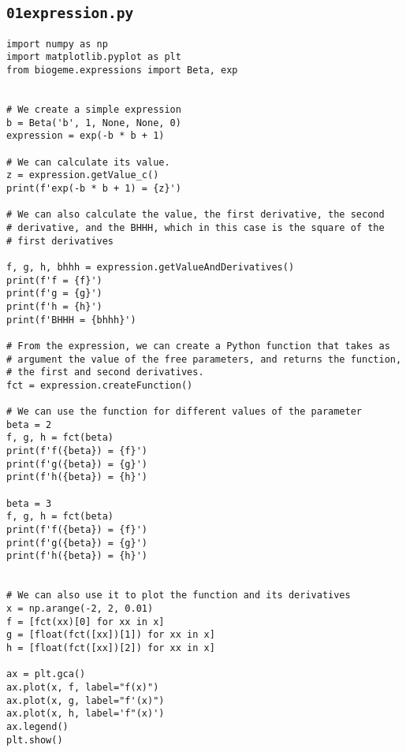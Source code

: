 \documentclass[12pt,a4paper]{article}
\begin{document}
\subsection{\lstinline$01expression.py$}\label{sec:01expression}
\begin{lstlisting}[style=numbers]
import numpy as np
import matplotlib.pyplot as plt
from biogeme.expressions import Beta, exp


# We create a simple expression
b = Beta('b', 1, None, None, 0)
expression = exp(-b * b + 1)

# We can calculate its value.
z = expression.getValue_c()
print(f'exp(-b * b + 1) = {z}')

# We can also calculate the value, the first derivative, the second
# derivative, and the BHHH, which in this case is the square of the
# first derivatives

f, g, h, bhhh = expression.getValueAndDerivatives()
print(f'f = {f}')
print(f'g = {g}')
print(f'h = {h}')
print(f'BHHH = {bhhh}')

# From the expression, we can create a Python function that takes as
# argument the value of the free parameters, and returns the function,
# the first and second derivatives.
fct = expression.createFunction()

# We can use the function for different values of the parameter
beta = 2
f, g, h = fct(beta)
print(f'f({beta}) = {f}')
print(f'g({beta}) = {g}')
print(f'h({beta}) = {h}')

beta = 3
f, g, h = fct(beta)
print(f'f({beta}) = {f}')
print(f'g({beta}) = {g}')
print(f'h({beta}) = {h}')


# We can also use it to plot the function and its derivatives
x = np.arange(-2, 2, 0.01)
f = [fct(xx)[0] for xx in x]
g = [float(fct([xx])[1]) for xx in x]
h = [float(fct([xx])[2]) for xx in x]

ax = plt.gca()
ax.plot(x, f, label="f(x)")
ax.plot(x, g, label="f'(x)")
ax.plot(x, h, label='f"(x)')
ax.legend()
plt.show()
\end{lstlisting}
\end{document}
